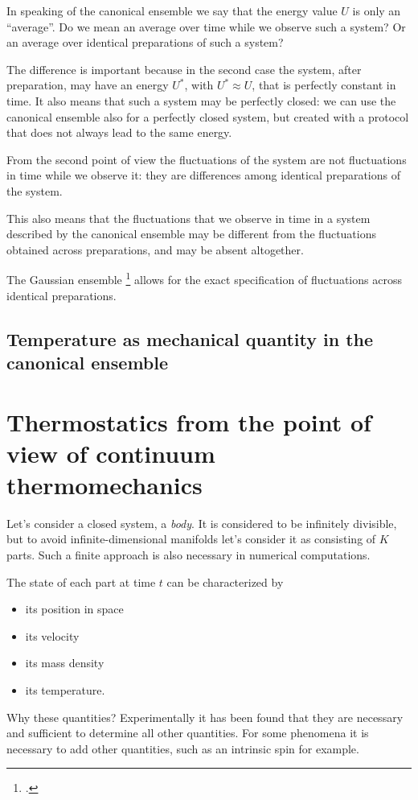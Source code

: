 \documentclass[\ifafour a4paper,12pt,\else a5paper,10pt,\fi%
onecolumn,oneside,article,%
british%
]{memoir}
\theoremstyle{remark}
\theoremstyle{innote}
\newcommand*{\citep}{\footcites}
\renewcommand*{\|}[1][]{\nonscript\,#1\vert\nonscript\;\mathopen{}}
\begin{document}
In speaking of the canonical ensemble we say that the energy value $U$ is only
an \enquote{average}. Do we mean an average over time while we observe such
a system? Or an average over identical preparations of such a system?

The difference is important because in the second case the system, after
preparation, may have an energy $U^{*}$, with $U^{*} \approx U$, that is
perfectly constant in time. It also means that such a system may be
perfectly closed: we can use the canonical ensemble also for a perfectly
closed system, but created with a protocol that does not always lead to the
same energy.

From the second point of view the fluctuations of the system are not
fluctuations in time while we observe it: they are differences among
identical preparations of the system.

This also means that the fluctuations that we observe in time in a system described
by the canonical ensemble may be different from the fluctuations obtained
across preparations, and may be absent altogether.

The Gaussian ensemble \citep{johaletal2003,hetherington1987} allows for the
exact specification of fluctuations across identical preparations.

\subsection{Temperature as mechanical quantity in the canonical ensemble}
\label{sec:temp_canonical}

\section{Thermostatics from the point of view of continuum thermomechanics}
\label{sec:tstat_tmech}

Let's consider a closed system, a \emph{body}. It is considered to be
infinitely divisible, but to avoid infinite-dimensional manifolds let's
consider it as consisting of $K$ parts. Such a finite approach is also
necessary in numerical computations.

The state of each part at time $t$ can be characterized by
\begin{itemize}
\item its position in space
\item its velocity
\item its mass density
\item its temperature.
\end{itemize}
Why these quantities? Experimentally it has been found that they are
necessary and sufficient to determine all other quantities. For some
phenomena it is necessary to add other quantities, such as an intrinsic
spin for example.
\end{document}
